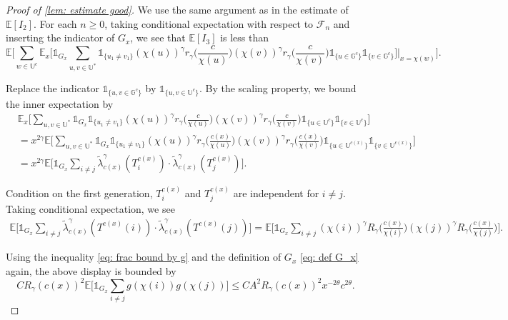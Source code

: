 \documentclass[12pt]{article}
\numberwithin{equation}{section}
\theoremstyle{plain}
\theoremstyle{definition}
\begin{document}
\begin{proof}[Proof of \cref{lem: estimate good}]
\noindent We use the same argument as in the estimate of $\mathbb{E}[I_2]$. For each $n\geq 0$, taking conditional expectation with respect to $\mathcal{F}_n$ and inserting the indicator of $G_{x}$, we see that $\mathbb{E}[I_3]$ is less than
\begin{equation}\label{eq: proof good I3 1}
 \mathbb{E}\bigg[\sum_{w\in\mathbb{U}^c}\mathbb{E}_x\bigg[\mathds{1}_{G_x}\sum_{u, v\in\mathbb{U}^*}\mathds{1}_{\{u_1\ne v_1\}}(\chi(u))^{\gamma}r_{\gamma}\Big(\frac{c}{\chi(u)}\Big)(\chi(v))^{\gamma}r_{\gamma}\Big(\frac{c}{\chi(v)}\Big)\mathds{1}_{\{u\in\mathbb{G}^c\}}\mathds{1}_{\{v\in\mathbb{G}^c\}}\bigg]\bigg|_{x=\chi(w)}\bigg].
\end{equation}

\noindent Replace the indicator $\mathds{1}_{\{u,v\in\mathbb{G}^c\}}$ by $\mathds{1}_{\{u,v\in\mathbb{U}^c\}}$. By the scaling property, we bound the inner expectation by
\begin{align}
&\mathbb{E}_x\bigg[\sum_{u, v\in\mathbb{U}^*}\mathds{1}_{G_x}\mathds{1}_{\{u_1\ne v_1\}}(\chi(u))^{\gamma}r_{\gamma}\Big(\frac{c}{\chi(u)}\Big)(\chi(v))^{\gamma}r_{\gamma}\Big(\frac{c}{\chi(v)}\Big)\mathds{1}_{\{u\in\mathbb{U}^c\}}\mathds{1}_{\{v\in\mathbb{U}^c\}}\bigg]\nonumber\\
&= x^{2\gamma}\mathbb{E}\bigg[\sum_{u, v\in\mathbb{U}^*}\mathds{1}_{G_x}\mathds{1}_{\{u_1\ne v_1\}}(\chi(u))^{\gamma}r_{\gamma}\Big(\frac{c(x)}{\chi(u)}\Big)(\chi(v))^{\gamma}r_{\gamma}\Big(\frac{c(x)}{\chi(v)}\Big)\mathds{1}_{\{u\in\mathbb{U}^{c(x)}\}}\mathds{1}_{\{v\in\mathbb{U}^{c(x)}\}}\bigg]\nonumber\\
&= x^{2\gamma}\mathbb{E}\bigg[\mathds{1}_{G_x}\sum_{i\ne j}\tilde{\lambda}^{\gamma}_{c(x)}(T^{c(x)}_i)\cdot \tilde{\lambda}^{\gamma}_{c(x)}(T^{c(x)}_j)\bigg].\label{eq: proof good I3 2}
\end{align}

\noindent Condition on the first generation, $T^{c(x)}_i$ and $T^{c(x)}_j$ are independent for $i\ne j$. Taking conditional expectation, we see
\begin{align*}
\mathbb{E}\bigg[\mathds{1}_{G_x}\sum_{i\ne j}\tilde{\lambda}^{\gamma}_{c(x)}(T^{c(x)}(i))\cdot \tilde{\lambda}^{\gamma}_{c(x)}(T^{c(x)}(j))\bigg]= \mathbb{E}\bigg[\mathds{1}_{G_x}\sum_{i\ne j}(\chi(i))^{\gamma}R_{\gamma}\Big(\frac{c(x)}{\chi(i)}\Big)(\chi(j))^{\gamma}R_{\gamma}\Big(\frac{c(x)}{\chi(j)}\Big)\bigg].
\end{align*}

\noindent Using the inequality \eqref{eq: frac bound by g} and the definition of $G_x$ \eqref{eq: def G_x} again, the above display is bounded by
\[CR_{\gamma}(c(x))^2\mathbb{E} \bigg[\mathds{1}_{G_x}\sum_{i\ne j} g(\chi(i)) g(\chi(j))\bigg]\leq C A^2 R_{\gamma}(c(x))^2 x^{-2\theta}c^{2\theta}. \]


\end{proof}
\end{document}

